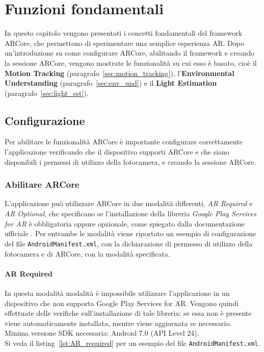 \documentclass[crop=false, class=book]{standalone}
\begin{document}
	\chapter{Funzioni fondamentali}
	
	In questo capitolo vengono presentati i concetti fondamentali del framework ARCore, che permettono di sperimentare una semplice esperienza AR. Dopo un'introduzione su come configurare ARCore, abilitando il framework e creando la sessione ARCore, vengono mostrate le funzionalità su cui esso è basato, cioè il \textbf{Motion Tracking} (paragrafo~\vref{sec:motion_tracking}), l'\textbf{Environmental Understanding} (paragrafo~\vref{sec:env_und}) e il \textbf{Light Estimation} (paragrafo~\vref{sec:light_est}).
	
	\section{Configurazione}
	Per abilitare le funzionalità ARCore è importante configurare correttamente l'applicazione verificando che il dispositivo supporti ARCore e che siano disponibili i permessi di utilizzo della fotocamera, e creando la sessione ARCore.
	
	\subsection{Abilitare ARCore}
	L'applicazione può utilizzare ARCore in due modalità differenti, \textit{AR Required} e \textit{AR Optional}, che specificano se l'installazione della libreria \textit{Google Play Services for AR} è obbligatoria oppure opzionale, come spiegato dalla documentazione ufficiale \cite{google2022enable}. Per entrambe le modalità viene riportato un esempio di configurazione del file \verb|AndroidManifest.xml|, con la dichiarazione di permesso di utilizzo della fotocamera e di ARCore, con la modalità specificata.
	
	\subsubsection{AR Required} 
	In questa modalità modalità è impossibile utilizzare l'applicazione in un dispositivo che non supporta Google Play Services for AR. Vengono quindi effettuate delle verifiche sull'installazione di tale libreria: se essa non è presente viene automaticamente installata, mentre viene aggiornata se necessario. 
	\\
	Minima versione SDK necessaria: Android 7.0 (API Level 24). 
	\\
	Si veda il listing~\vref{lst:AR_required} per un esempio del file \verb|AndroidManifest.xml|.
	
\end{document}
